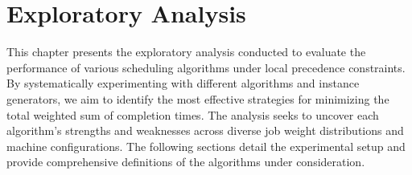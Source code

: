 \chapter{Exploratory Analysis}\label{ch:exploratory-analysis}

This chapter presents the exploratory analysis conducted to evaluate the performance of various scheduling algorithms under local precedence constraints. By systematically experimenting with different algorithms and instance generators, we aim to identify the most effective strategies for minimizing the total weighted sum of completion times. The analysis seeks to uncover each algorithm's strengths and weaknesses across diverse job weight distributions and machine configurations. The following sections detail the experimental setup and provide comprehensive definitions of the algorithms under consideration.



%
%
